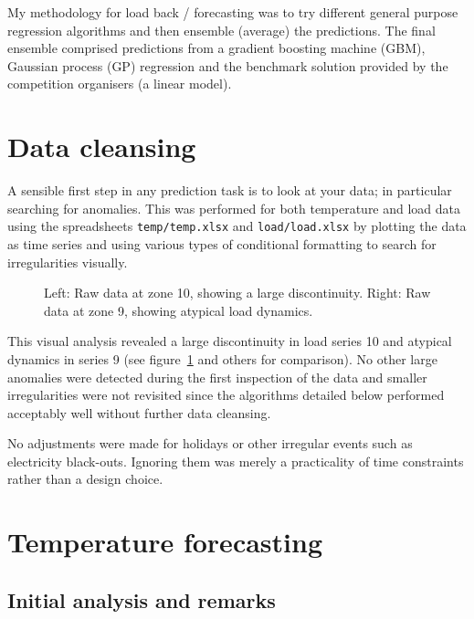 My methodology for load back / forecasting was to try different general purpose regression algorithms and then ensemble (average) the predictions.
The final ensemble comprised predictions from a gradient boosting machine (GBM), Gaussian process (GP) regression and the benchmark solution provided by the competition organisers (a linear model).

\section{Data cleansing}

\label{sec:cleans}

A sensible first step in any prediction task is to look at your data; in particular searching for anomalies.
This was performed for both temperature and load data using the spreadsheets \texttt{temp/temp.xlsx} and \texttt{load/load.xlsx} by plotting the data as time series and using various types of conditional formatting to search for irregularities visually.

\begin{figure}[ht]
  \begin{center}
    
  \end{center}
  \caption{Left: Raw data at zone 10, showing a large discontinuity. Right: Raw data at zone 9, showing atypical load dynamics.}
  \label{fig:load}
\end{figure}

This visual analysis revealed a large discontinuity in load series 10 and atypical dynamics in series 9 (see figure~\ref{fig:load} and others for comparison).
No other large anomalies were detected during the first inspection of the data and smaller irregularities were not revisited since the algorithms detailed below performed acceptably well without further data cleansing.

No adjustments were made for holidays or other irregular events such as electricity black-outs.
Ignoring them was merely a practicality of time constraints rather than a design choice.

\section{Temperature forecasting}

\label{sec:temp}

\subsection{Initial analysis and remarks}

